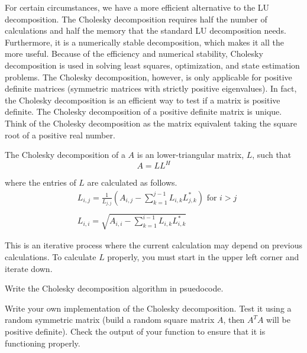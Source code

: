 

For certain circumstances, we have a more efficient alternative to the LU decomposition.  The Cholesky decomposition requires half the number of calculations and half the memory that the standard LU decomposition needs.  Furthermore, it is a numerically stable decomposition, which makes it all the more useful.  Because of the efficiency and numerical stability, Cholesky decomposition is used in solving least squares, optimization, and state estimation problems.  The Cholesky decomposition, however, is only applicable for positive definite matrices (symmetric matrices with strictly positive eigenvalues).  In fact, the Cholesky decomposition is an efficient way to test if a matrix is positive definite.  The Cholesky decomposition of a positive definite matrix is unique.  Think of the Cholesky decomposition as the matrix equivalent taking the square root of a positive real number.

The Cholesky decomposition of a $A$ is an lower-triangular matrix, $L$, such that
\begin{equation*}
 A = LL^H
\end{equation*}

where the entries of $L$ are calculated as follows.
\begin{align*}
&L_{i,j} = \frac{1}{L_{j,j}}\left(A_{i,j} -\sum_{k=1}^{j-1}{L_{i,k}L_{j,k}^*}\right) \mbox{ for $i>j$} \\ \\
&L_{i,i} = \sqrt{A_{i,i} - \sum_{k=1}^{i-1}{L_{i,k}L_{i,k}^*}}
\end{align*}

This is an iterative process where the current calculation may depend on previous calculations.  To calculate $L$ properly, you must start in the upper left corner and iterate down.

\begin{problem}
Write the Cholesky decomposition algorithm in psuedocode.
\end{problem}

\begin{problem}
Write your own implementation of the Cholesky decomposition. Test it using a random symmetric matrix (build a random square matrix $A$, then $A^TA$ will be positive definite). Check the output of your function to ensure that it is functioning properly.
\end{problem}

